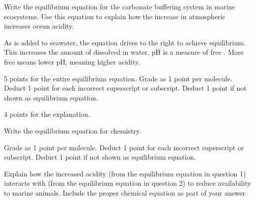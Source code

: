 \documentclass[11pt]{exam}
\begin{document}
\begin{questions}


\question[10]
Write the equilibrium equation for the carbonate buffering system in
marine ecosystems. Use this equation to explain how the increase in
atmospheric  increases ocean acidity. 

\begin{minipage}[t][6in]{0.95\textwidth}%
\begin{solution}


\vspace{\baselineskip}

As  is added to seawater, the equation drives to the right to achieve equilibrium. This increases the amount of  dissolved in water. pH is a measure of free .  More free  means lower pH, meaning higher acidity.

\vspace{\baselineskip}

5 points for the entire equilibrium equation. Grade as 1 point per molecule. Deduct 1 point for each incorrect superscript or subscript. Deduct 1 point if not shown as equilibrium equation.

4 points for the explanation.

\end{solution}%
\end{minipage}

\question[5]
Write the equilibrium equation for  chemistry.

\begin{minipage}[t][1in]{0.95\textwidth}%
\begin{solution}

Grade as 1 point per molecule. Deduct 1 point for each incorrect superscript or subscript. Deduct 1 point if not shown as equilibrium equation.
\end{solution}%
\end{minipage}

\newpage

\question[10]
Explain how the increased acidity (from the equilibrium equation in
question 1) interacts with  (from the equilibrium equation in question 2)
to reduce  availability to marine animals. Include
the proper chemical equation as part of your answer 


\end{questions}
\end{document}
